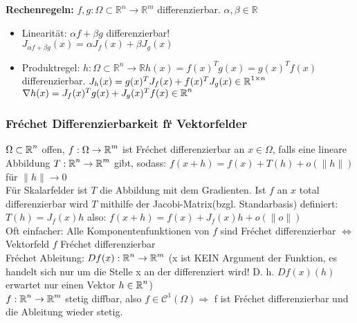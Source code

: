 \documentclass[german]{latex4ei/latex4ei_sheet}
\begin{document}
\textbf{Rechenregeln:} $f,g: \Omega \subset \mathbb{R}^n \rightarrow \mathbb{R}^m$ differenzierbar. $\alpha,\beta \in \mathbb{R} $
\begin{itemize}
\item Linearit\"at: $\alpha f + \beta g$ differenzierbar!\\
$J_{\alpha f + \beta g}(x)=\alpha J_f(x) + \beta J_g (x)$
\item Produktregel: $h: \Omega \subset \mathbb{R}^n\rightarrow \mathbb{R} h(x)=f(x)^Tg(x)=g(x)^Tf(x)$ differenzierbar. $J_h(x)=g(x)^TJ_f(x)+f(x)^TJ_g(x) \in \operatorname{\mathbb R}^{1 \times n}$\\
$\nabla h(x)=J_f(x)^T g(x)+J_g(x)^T f(x) \in \operatorname{\mathbb R}^{n}$
\end{itemize}

\subsubsection{Fr\'echet Differenzierbarkeit f\"r Vektorfelder}
$\Omega \subset \operatorname{\mathbb R}^n$ offen, $f:\Omega \rightarrow \operatorname{\mathbb R}^m$ ist Fr\'echet differenzierbar an $x\in \Omega$, falls eine lineare Abbildung $T:\operatorname{\mathbb R}^n \rightarrow \operatorname{\mathbb R}^m$ gibt, sodass: $f(x+h)=f(x)+T(h)+o(\|h\|)$ f\"ur $\|h\|\to 0$\\
F\"ur Skalarfelder ist $T$ die Abbildung mit dem Gradienten. Ist $f$ an $x$ total differenzierbar wird $T$ mithilfe der Jacobi-Matrix(bzgl. Standarbasis) definiert: $T(h)=J_f(x) h$ also: $f(x+h)=f(x)+J_f(x) h+o(\|o\|)$\\
Oft einfacher: Alle Komponentenfunktionen von $f$ sind Fr\'echet differenzierbar $\Leftrightarrow$ Vektorfeld $f$ Fr\'echet differenzierbar\\
Fr\'echet Ableitung: $D f(x): \operatorname{\mathbb R}^n \rightarrow \operatorname{\mathbb R}^m$ (x ist KEIN Argument der Funktion, es handelt sich nur um die Stelle x an der differenziert wird! D. h. $D f(x)(h)$ erwartet nur einen Vektor $h \in \operatorname{\mathbb R}^n$)\\
$f: \operatorname{\mathbb R}^n \rightarrow \operatorname{\mathbb R}^m$ stetig diffbar, also $f \in \mathcal{C}^1(\Omega) \Rightarrow $ f ist Fr\'echet differenzierbar und die Ableitung wieder stetig.
\end{document}
